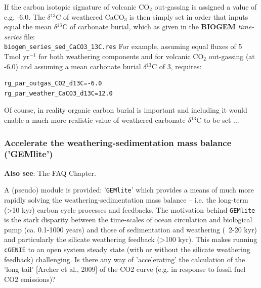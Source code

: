 \documentclass[11pt,fleqn]{book} %
\begin{document}
If the carbon isotopic signature of volcanic CO$_{2}$ out-gassing is assigned a value of e.g. -6.0\textperthousand. The $\delta$$^{13}$C of weathered CaCO$_{3}$ is then simply set in order that inputs equal the mean $\delta$$^{13}$C of carbonate burial, which as given in the \textbf{BIOGEM} \textit{time-series} file:
\\\texttt{biogem\_series\_sed\_CaCO3\_13C.res}
For example, assuming equal fluxes of 5 Tmol yr$^{-1}$ for both weathering components and for volcanic CO$_{2}$ out-gassing (at -6.0\textperthousand) and assuming a mean carbonate burial $\delta$$^{13}$C of 3\textperthousand, requires:
\vspace{-1mm}\begin{verbatim}
rg_par_outgas_CO2_d13C=-6.0
rg_par_weather_CaCO3_d13C=12.0
\end{verbatim}\vspace{-1mm}
Of course, in reality organic carbon burial is important and including it would enable a much more realistic value of weathered carbonate $\delta$$^{13}$C to be set ...

%
\subsubsection{Accelerate the weathering-sedimentation mass balance ('GEMlite')}\label{GEMlite}


\noindent \textbf{Also see}: The FAQ Chapter.

\noindent A (pseudo) module is provided: '\texttt{GEMlite}' which provides a means of much more rapidly solving the weathering-sedimentation mass balance -- i.e. the long-term (>10 kyr) carbon cycle processes and feedbacks. The motivation behind \texttt{GEMlite} is the stark disparity between the time-scales of ocean circulation and biological pump (ca. 0.1-1000 years) and those of sedimentation and weathering (~2-20 kyr) and particularly the silicate weathering feedback (>100 kyr). This makes running \texttt{cGENIE} to an open system steady state (with or without the silicate weathering feedback) challenging. Is there any way of 'accelerating' the calculation of the 'long tail' [Archer et al., 2009] of the CO2 curve (e.g. in response to fossil fuel CO2 emissions)?
\end{document}
